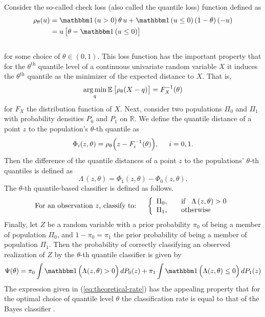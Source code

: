 Consider the so-called check loss (also called the quantile loss) function
defined as
\begin{align}
  \label{eq:check-loss}
  \begin{split}
    \rho_\theta(u)
    &= \ind(u > 0)\, \theta\, u  + \ind (u \leq 0)\, (1 - \theta)\, (-u)  \\[0ex]
    &= u\, \big[ \theta - \ind(u \leq 0) \big]
  \end{split}
\end{align}
\\[-1ex]
for some choice of $\theta \in (0,1)$.  This loss function has the important
property that for the $\theta^{\text{th}}$ quantile level of a continuous
univariate random variable $X$ it induces the $\theta^{\text{th}}$ quantile as
the minimizer of the expected distance to $X$.  That is,
\begin{equation}
  \label{eq:check-loss-min}
  \operatorname*{arg\,min}_q \mathbb{E}\, \big[ \rho_\theta (X - q) \big] = F_X^{-1}(\theta)
\end{equation}
for $F_X$ the distribution function of $X$.  Next, consider two populations
$\Pi_0$ and $\Pi_1$ with probability densities $P_0$ and $P_1$ on $\mathbb{R}$.
We define the quantile distance of a point $z$ to the population's $\theta$-th
quantile as
\begin{equation}
  \label{eq:phi}
  \Phi_i(z, \theta) = \rho_{\theta}\Big(z - F_i^{-1}(\theta)\Big),
  \hspace{5mm} i = 0, 1.
\end{equation}
Then the difference of the quantile distances of a point $z$ to the populations'
$\theta$-th quantiles is defined as
\begin{equation}
  \Lambda\,(z, \theta) = \Phi_1(z, \theta) - \Phi_0(z, \theta).
\end{equation}
The $\theta$-th quantile-based classifier is defined as follows.
\begin{equation}
  \label{eq:quantile-classifier}
  \text{For an observation $z$, classify to:} \hspace{5mm} \left\{ 
    \begin{array}{lcl}
      \Pi_0, & & \text{if} \hspace{3mm}\Lambda\,(z, \theta) > 0 \\[0ex]
      \Pi_1, & & \text{otherwise}
    \end{array}
  \right.
\end{equation}
Finally, let $Z$ be a random variable with a prior probability $\pi_0$ of being
a member of population $\Pi_0$, and $1 - \pi_0 = \pi_1$ the prior probability of
being a member of population $\Pi_1$.  Then the probability of correctly
classifying an observed realization of $Z$ by the $\theta$-th quantile
classifier is given by
\begin{equation}
  \label{eq:theoretical-rate}
  \Psi(\theta) =
  \pi_0 \int \ind\Big( \Lambda(z, \theta) > 0 \Big)\, dP_0(z) +
  \pi_1 \int \ind\Big(\Lambda(z, \theta) \leq 0 \Big)\, dP_1(z)
\end{equation}
The expression given in (\ref{eq:theoretical-rate}) has the appealing property
that for the optimal choice of quantile level $\theta$ the classification rate is
equal to that of the Bayes classifier \citep{hennig2016}.


